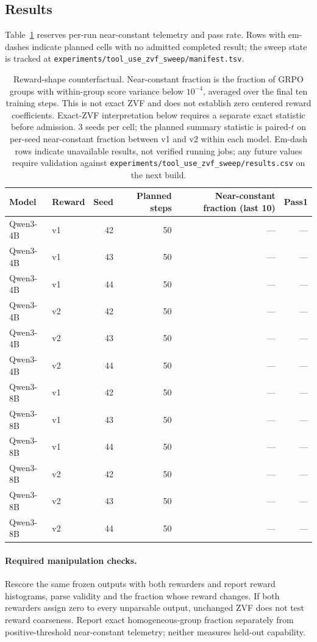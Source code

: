 \subsection{Results}
Table~\ref{tab:zvf_counterfactual} reserves per-run near-constant telemetry and pass rate.
Rows with em-dashes indicate planned cells with no admitted completed result; the sweep state is tracked at
\texttt{experiments/tool\_use\_zvf\_sweep/manifest.tsv}.

\begin{table}[h]
\centering
\small
\begin{tabular}{llrrrr}
\toprule
Model & Reward & Seed & Planned steps & Near-constant fraction (last 10) & Pass\@1 \\
\midrule
Qwen3-4B & v1 & 42 & 50 & --- & --- \\
Qwen3-4B & v1 & 43 & 50 & --- & --- \\
Qwen3-4B & v1 & 44 & 50 & --- & --- \\
Qwen3-4B & v2 & 42 & 50 & --- & --- \\
Qwen3-4B & v2 & 43 & 50 & --- & --- \\
Qwen3-4B & v2 & 44 & 50 & --- & --- \\
\midrule
Qwen3-8B & v1 & 42 & 50 & --- & --- \\
Qwen3-8B & v1 & 43 & 50 & --- & --- \\
Qwen3-8B & v1 & 44 & 50 & --- & --- \\
Qwen3-8B & v2 & 42 & 50 & --- & --- \\
Qwen3-8B & v2 & 43 & 50 & --- & --- \\
Qwen3-8B & v2 & 44 & 50 & --- & --- \\
\bottomrule
\end{tabular}
\caption{Reward-shape counterfactual. Near-constant fraction is the fraction of GRPO groups
with within-group score variance below \(10^{-4}\), averaged over the final
ten training steps. This is not exact ZVF and does not establish zero centered reward coefficients. Exact-ZVF interpretation below requires a separate exact statistic before admission. \(3\) seeds per cell; the planned summary statistic is
paired-\(t\) on per-seed near-constant fraction between v1 and v2 within each model. Em-dash
rows indicate unavailable results, not verified running jobs; any future values require validation against
\texttt{experiments/tool\_use\_zvf\_sweep/results.csv} on the next build.}
\label{tab:zvf_counterfactual}
\end{table}

\paragraph{Required manipulation checks.}
Rescore the same frozen outputs with both rewarders and report reward histograms,
parse validity and the fraction whose reward changes. If both rewarders assign
zero to every unparsable output, unchanged ZVF does not test reward coarseness.
Report exact homogeneous-group fraction separately from positive-threshold
near-constant telemetry; neither measures held-out capability.

